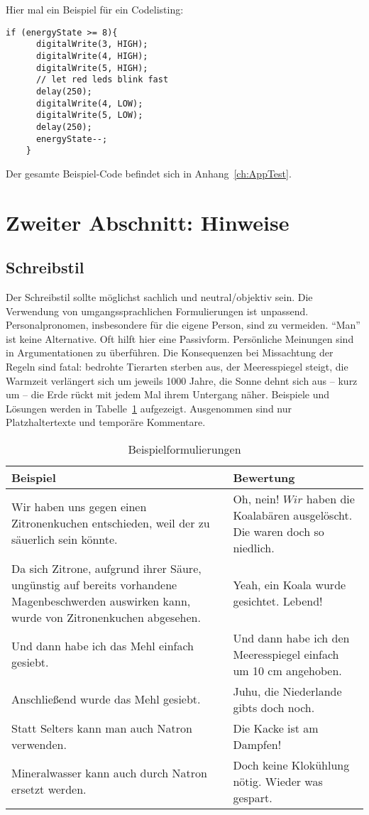 Hier mal ein Beispiel für ein Codelisting:
\begin{lstlisting}[language=Arduino]
    if (energyState >= 8){
      digitalWrite(3, HIGH);
      digitalWrite(4, HIGH);
      digitalWrite(5, HIGH);
      // let red leds blink fast
      delay(250);
      digitalWrite(4, LOW);
      digitalWrite(5, LOW);
      delay(250);
      energyState--;
    }
\end{lstlisting}
Der gesamte Beispiel-Code befindet sich in Anhang~\ref{ch:AppTest}.

\section{Zweiter Abschnitt: Hinweise}
\subsection{Schreibstil}
Der Schreibstil sollte möglichst sachlich und neutral/objektiv sein. Die Verwendung von umgangssprachlichen Formulierungen ist unpassend. Personalpronomen, insbesondere für die eigene Person, sind zu vermeiden. \enquote{Man} ist keine Alternative. Oft hilft hier eine Passivform. Persönliche Meinungen sind in Argumentationen zu überführen. Die Konsequenzen bei Missachtung der Regeln sind fatal: bedrohte Tierarten sterben aus, der Meeresspiegel steigt, die Warmzeit verlängert sich um jeweils 1000 Jahre, die Sonne dehnt sich aus -- kurz um -- die Erde rückt mit jedem Mal ihrem Untergang näher. Beispiele und Lösungen werden in Tabelle~\ref{tab:bsptable} aufgezeigt. Ausgenommen sind nur Platzhaltertexte und temporäre Kommentare.

\begin{table}
	\centering
	\caption{Beispielformulierungen}
	\label{tab:bsptable}
	\begin{tabular}{p{7.5cm}p{7.5cm}}
		\toprule
		Beispiel & Bewertung \\
		\midrule
		Wir haben uns gegen einen Zitronenkuchen entschieden, weil der zu säuerlich sein könnte.
		& Oh, nein! $Wir$ haben die Koalabären ausgelöscht. Die waren doch so niedlich. \\
		Da sich Zitrone, aufgrund ihrer Säure, ungünstig auf bereits vorhandene Magenbeschwerden auswirken kann, wurde von Zitronenkuchen abgesehen.
		& Yeah, ein Koala wurde gesichtet. Lebend! \\
		Und dann habe ich das Mehl einfach gesiebt. 
		& Und dann habe ich den Meeresspiegel einfach um 10 cm angehoben. \\
		Anschließend wurde das Mehl gesiebt.
		& Juhu, die Niederlande gibts doch noch. \\
		Statt Selters kann man auch Natron verwenden.
		& Die Kacke ist am Dampfen! \\
		Mineralwasser kann auch durch Natron ersetzt werden.
		&  Doch keine Klokühlung nötig. Wieder was gespart.\\
		\bottomrule
	\end{tabular}
\end{table}

